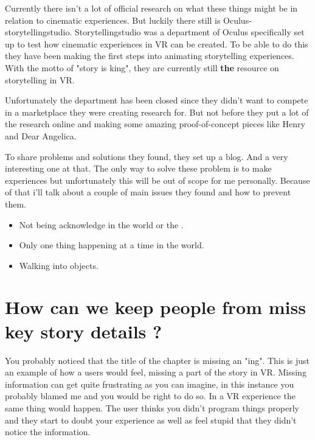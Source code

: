 \documentclass{report}
\begin{document}
				Currently there isn't a lot of official research on what these things might be in relation to cinematic experiences. But luckily there still is Oculus-storytellingstudio. Storytellingstudio was a department of Oculus specifically set up to test how cinematic experiences in VR can be created. To be able to do this they have been making the first steps into animating storytelling experiences. With the motto of "story is king", they are currently still \textbf{the} resource on storytelling in VR. 
				
				Unfortunately the department has been closed since they didn't want to compete in a marketplace they were creating research for. But not before they put a lot of the research online and making some amazing proof-of-concept pieces like Henry and Dear Angelica.
				
				
				To share problems and solutions they found, they set up a blog. And a very interesting one at that. The only way to solve these problem is to make experiences but unfortunately this will be out of scope for me personally. Because of that i'll talk about a couple of main issues they found and how to prevent them.
				
				\begin{itemize}
					\item Not being acknowledge in the world or the .
					\item Only one thing happening at a time in the world.
					\item Walking into objects.
				\end{itemize}
				
				
				
				\chapter{How can we keep people from miss key story details ?}
				
				You probably noticed that the title of the chapter is missing an "ing". This is just an example of how a users would feel, missing a part of the story in VR. Missing information can get quite frustrating as you can imagine, in this instance you probably blamed me and you would be right to do so. In a VR experience the same thing would happen. The user thinks you didn't program things properly and they start to doubt your experience as well as feel stupid that they didn't notice the information.
				
\end{document}
